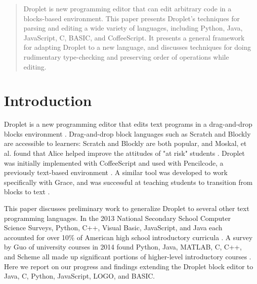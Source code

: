 \documentclass[conference]{IEEEtran}
\begin{document}
\begin{abstract}
Droplet is new programming editor that can edit arbitrary code in a blocks-based environment. This paper presents Droplet's techniques for parsing and editing a wide variety of languages, including Python, Java, JavaScript, C, BASIC, and CoffeeScript. It presents a general framework for adapting Droplet to a new language, and discusses techniques for doing rudimentary type-checking and preserving order of operations while editing.

\end{abstract}





%
\IEEEpeerreviewmaketitle



\section{Introduction}
Droplet is a new programming editor that edits text programs in a drag-and-drop blocks environment \cite{Droplet}. Drag-and-drop block languages such as Scratch and Blockly are accessible to learners: Scratch and Blockly are both popular, and Moskal, et al. found that Alice helped improve the attitudes of "at risk" students \cite{Moskal}.
Droplet was initially implemented with CoffeeScript and used with Pencilcode, a previously text-based environment \cite{Droplet}\cite{Pencilcode}. A similar tool was developed to work specifically with Grace, and was successful at teaching students to transition from blocks to text \cite{TiledGrace}.

This paper discusses preliminary work to generalize Droplet to several other text programming languages. In the 2013 National Secondary School Computer Science Surveys, Python, C++, Visual Basic, JavaScript, and Java each accounted for over 10\% of American high school introductory curricula \cite{CSTA}. A survey by Guo of university courses in 2014 found Python, Java, MATLAB, C, C++, and Scheme all made up significant portions of higher-level introductory courses \cite{Guo}. Here we report on our progress and findings extending the Droplet block editor to Java, C, Python, JavaScript, LOGO, and BASIC.
\end{document}

